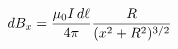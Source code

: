 \documentclass[preview]{standalone}
\begin{document}
\begin{align*}
dB_{x} = { \mu_0 I \, d\ell \over 4\pi } {R \over (x^2 + R^2)^{3/2}}
\end{align*}
\end{document}
